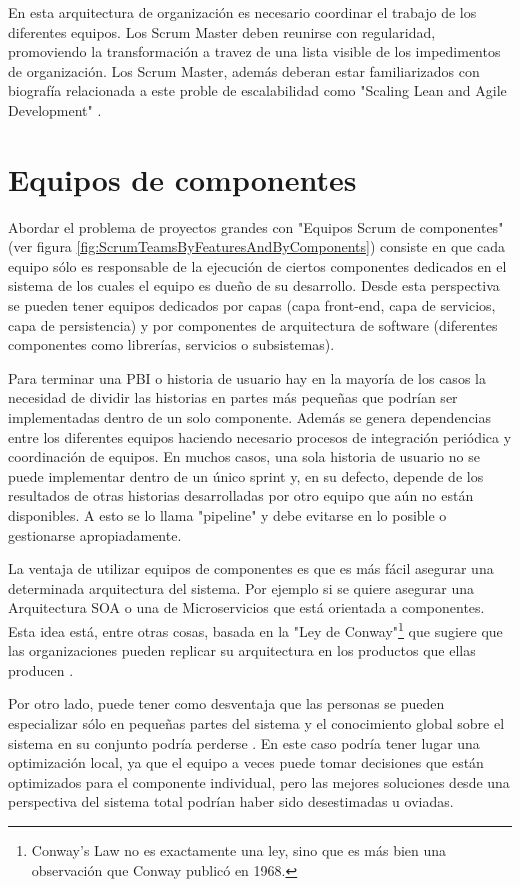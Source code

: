 En esta arquitectura de organización es necesario coordinar el trabajo de los diferentes equipos. Los Scrum Master deben reunirse con regularidad, promoviendo la transformación a travez de una lista visible de los impedimentos de organización. Los Scrum Master, además deberan estar familiarizados con biografía relacionada a este proble de escalabilidad como "Scaling Lean and Agile Development" \cite{Larman-Vodde-2008}.

\section{Equipos de componentes}

Abordar el problema de proyectos grandes con "Equipos Scrum de componentes" (ver figura \ref{fig:ScrumTeamsByFeaturesAndByComponents}) consiste en que cada equipo sólo es responsable de la ejecución de ciertos componentes dedicados en el sistema de los cuales el equipo es dueño de su desarrollo. Desde esta perspectiva se pueden tener equipos dedicados por capas (capa front-end, capa de servicios, capa de persistencia) y por componentes de arquitectura de software (diferentes componentes como librerías, servicios o subsistemas).

Para terminar una PBI o historia de usuario hay en la mayoría de los casos la necesidad de dividir las historias en partes más pequeñas que podrían ser implementadas dentro de un solo componente. Además se genera dependencias entre los diferentes equipos haciendo necesario procesos de integración periódica y coordinación de equipos. En muchos casos, una sola historia de usuario no se puede implementar dentro de un único sprint y, en su defecto, depende de los resultados de otras historias desarrolladas por otro equipo que aún no están disponibles. A esto se lo llama "pipeline" y debe evitarse en lo posible o gestionarse apropiadamente.

La ventaja de utilizar equipos de componentes es que es más fácil asegurar una determinada arquitectura del sistema. Por ejemplo si se quiere asegurar una Arquitectura SOA o una de Microservicios que está orientada a componentes. Esta idea está, entre otras cosas, basada en la "Ley de Conway"\footnote{Conway's Law \cite{Conway-1968} no es exactamente una ley, sino que es más bien una observación que Conway publicó en 1968.} que sugiere que las organizaciones pueden replicar su arquitectura en los productos que ellas producen \cite{Martin-Fowler-2014}. 

Por otro lado, puede tener como desventaja que las personas se pueden especializar sólo en pequeñas partes del sistema y el conocimiento global sobre el sistema en su conjunto podría perderse \cite{Scrum-Institute-2015}. En este caso podría tener lugar una optimización local, ya que el equipo a veces puede tomar decisiones que están optimizados para el componente individual, pero las mejores soluciones desde una perspectiva del sistema total podrían haber sido desestimadas u oviadas.

